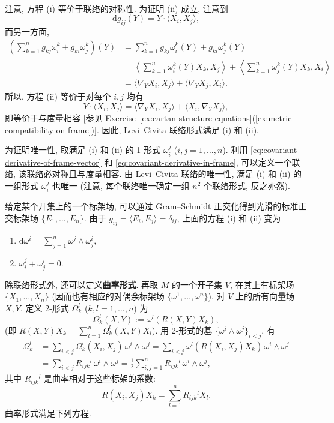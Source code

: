 \begin{RiemannProof}
\begin{align*}
\end{align*}
注意, 方程 (i) 等价于联络的对称性. 为证明 (ii) 成立, 注意到
\[
  \mathrm{d}g_{ij}(Y)=Y\cdot\langle X_i,X_j\rangle,
\]
而另一方面,
\begin{align*}
  \left(\sum_{k=1}^n g_{kj}\omega_i^k+g_{ki}\omega_j^k\right)(Y)
  &=\sum_{k=1}^n g_{kj}\omega_i^k(Y)+g_{ki}\omega_j^k(Y)\\
  &=\left\langle\sum_{k=1}^n\omega_i^k(Y)X_k,X_j\right\rangle
    +\left\langle\sum_{k=1}^n\omega_j^k(Y)X_k,X_i\right\rangle\\
  &=\langle\nabla_YX_i,X_j\rangle+\langle\nabla_YX_j,X_i\rangle.
\end{align*}
所以, 方程 (ii) 等价于对每个 $i,j$ 均有
\[
  Y\cdot\langle X_i,X_j\rangle
  =\langle\nabla_YX_i,X_j\rangle+\langle X_i,\nabla_YX_j\rangle,
\]
即等价于与度量相容 [参见 Exercise~\ref{ex:cartan-structure-equations}(\ref{ex:metric-compatibility-on-frame})]. 因此, Levi–Civita 联络形式满足 (i) 和 (ii).

为证明唯一性, 取满足 (i) 和 (ii) 的 1-形式 $\omega_i^j$ ($i,j=1,\ldots,n$). 利用 \eqref{eq:covariant-derivative-of-frame-vector} 和 \eqref{eq:covariant-derivative-in-frame}, 可以定义一个联络, 该联络必对称且与度量相容. 由 Levi–Civita 联络的唯一性, 满足 (i) 和 (ii) 的一组形式 $\omega_i^j$ 也唯一 (注意, 每个联络唯一确定一组 $n^2$ 个联络形式, 反之亦然).
\end{RiemannProof}

\begin{RiemannRemark}\label{rem:cartan-first-equation-orthonormal-frame}
给定某个开集上的一个标架场, 可以通过 Gram–Schmidt 正交化得到光滑的标准正交标架场 $\{E_1,\ldots,E_n\}$. 由于 $g_{ij}=\langle E_i,E_j\rangle=\delta_{ij}$, 上面的方程 (i) 和 (ii) 变为
\begin{enumerate}[label=(\roman*),leftmargin=*]
\item $\mathrm{d}\omega^i=\sum_{j=1}^n\omega^j\wedge\omega_j^i$,
\item $\omega_i^j+\omega_j^i=0$.
\end{enumerate}
\end{RiemannRemark}

除联络形式外, 还可以定义\textbf{曲率形式}. 再取 $M$ 的一个开子集 $V$, 在其上有标架场 $\{X_1,\ldots,X_n\}$ (因而也有相应的对偶余标架场 $\{\omega^1,\ldots,\omega^n\}$). 对 $V$ 上的所有向量场 $X,Y$, 定义 2-形式 $\Omega_k^l$ ($k,l=1,\ldots,n$) 为
\[
  \Omega_k^l(X,Y):=\omega^l(R(X,Y)X_k),
\]
(即 $R(X,Y)X_k=\sum_{l=1}^n\Omega_k^l(X,Y)X_l$). 用 2-形式的基 $\{\omega^i\wedge\omega^j\}_{i<j}$, 有
\begin{align*}
  \Omega_k^l
  &=\sum_{i<j}\Omega_k^l(X_i,X_j)\,\omega^i\wedge\omega^j
    =\sum_{i<j}\omega^l(R(X_i,X_j)X_k)\,\omega^i\wedge\omega^j\\
  &=\sum_{i<j}R_{ijk}{}^l\,\omega^i\wedge\omega^j
    =\frac12\sum_{i,j=1}^nR_{ijk}{}^l\,\omega^i\wedge\omega^j,
\end{align*}
其中 $R_{ijk}{}^l$ 是曲率相对于这些标架的系数:
\[
  R(X_i,X_j)X_k=\sum_{l=1}^nR_{ijk}{}^lX_l.
\]
曲率形式满足下列方程.

